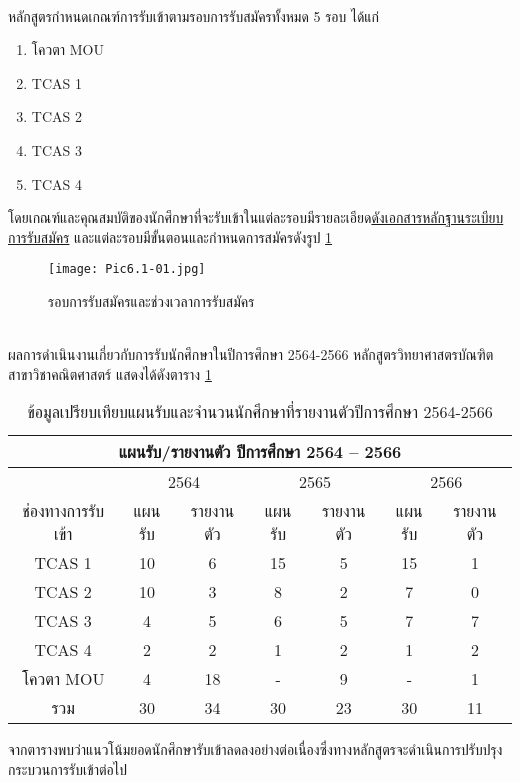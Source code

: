 \\[0.5cm]
หลักสูตรกำหนดเกณฑ์การรับเข้าตามรอบการรับสมัครทั้งหมด 5 รอบ ได้แก่
	\begin{enumerate}
		\item โควตา MOU
		\item TCAS 1
		\item TCAS 2
		\item TCAS 3
		\item TCAS 4
	\end{enumerate}
โดยเกณฑ์และคุณสมบัติของนักศึกษาที่จะรับเข้าในแต่ละรอบมีรายละเอียด\underline{ดังเอกสารหลักฐานระเบียบการรับสมัคร}
และแต่ละรอบมีขั้นตอนและกำหนดการสมัครดังรูป
\ref{Pic6.1-01}\\
\begin{figure}[h!]
	\begin{center}
		\texttt{[image: Pic6.1-01.jpg]}
		\end{center}
	\caption{รอบการรับสมัครและช่วงเวลาการรับสมัคร}
	\label{Pic6.1-01}
\end{figure}\\
ผลการดำเนินงานเกี่ยวกับการรับนักศึกษาในปีการศึกษา 2564-2566 หลักสูตรวิทยาศาสตรบัณฑิต สาขาวิชาคณิตศาสตร์ แสดงได้ดังตาราง \ref{table:6.1}
\newpage
\begin{longtable}{ |c|c|c|c|c|c|c|  }
\caption{ข้อมูลเปรียบเทียบแผนรับและจำนวนนักศึกษาที่รายงานตัวปีการศึกษา 2564-2566 }
\label{table:6.1}\\
 \hline
 \multicolumn{7}{|c|}{แผนรับ/รายงานตัว ปีการศึกษา 2564 – 2566} \\
 \hline
  & \multicolumn{2}{c|}{2564} & \multicolumn{2}{c|}{2565} & \multicolumn{2}{c|}{2566} \\
 \hline
 ช่องทางการรับเข้า & แผนรับ & รายงานตัว & แผนรับ & รายงานตัว & แผนรับ & รายงานตัว \\
 \hline
  TCAS 1 & 10 & 6 & 15 & 5 &  15 &   1 \\
 \hline
   TCAS 2& 10 & 3 & 8 & 2 &  7 &   0 \\
 \hline
   TCAS 3& 4 & 5 & 6 & 5 &  7 &  7  \\
 \hline
   TCAS 4 & 2 & 2 & 1 & 2 & 1  & 2   \\
 \hline
 โควตา MOU  & 4 & 18 & - &  9 & -  & 1   \\
 \hline
  รวม  & 30 & 34 & 30 &  23 & 30  &  11  \\
 \hline
\end{longtable}

จากตารางพบว่าแนวโน้มยอดนักศึกษารับเข้าลดลงอย่างต่อเนื่องซึ่งทางหลักสูตรจะดำเนินการปรับปรุงกระบวนการรับเข้าต่อไป
     
